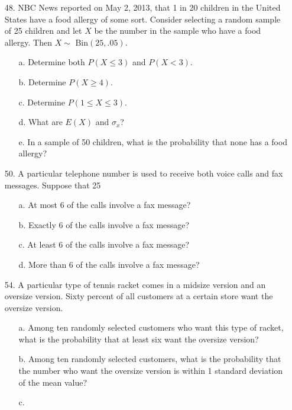 \documentclass[letterpaper,12pt]{article}
\begin{document}
\begin{enumerate}
\begin{enumerate}
    \end{enumerate}
  \item[48.]
    NBC News reported on May 2, 2013, that 1 in 20 children in the United States have a food allergy of some sort. Consider selecting a random sample of 25 children and let $X$ be the number in the sample who have a food allergy. Then $X \sim$ Bin$(25, .05)$.
    \begin{enumerate}
      \item[a.]
        Determine both $P(X \le 3)$ and $P(X < 3)$.
      \item[b.]
        Determine $P(X \ge 4)$.
      \item[c.]
        Determine $P(1 \le X \le 3)$.
      \item[d.]
        What are $E(X)$ and $\sigma_x$?
      \item[e.]
        In a sample of 50 children, what is the probability that none has a food allergy?
    \end{enumerate}
  \item[50.]
    A particular telephone number is used to receive both voice calls and fax messages. Suppose that 25%
    \begin{enumerate}
      \item[a.]
        At most 6 of the calls involve a fax message?
      \item[b.]
        Exactly 6 of the calls involve a fax message?
      \item[c.]
        At least 6 of the calls involve a fax message?
      \item[d.]
        More than 6 of the calls involve a fax message?
    \end{enumerate}
  \item[54.]
    A particular type of tennis racket comes in a midsize version and an oversize version. Sixty percent of all customers at a certain store want the oversize version.
    \begin{enumerate}
      \item[a.]
        Among ten randomly selected customers who want this type of racket, what is the probability that at least six want the oversize version?
      \item[b.]
        Among ten randomly selected customers, what is the probability that the number who want the oversize version is within 1 standard deviation of the mean value?
      \item[c.]

\end{enumerate}
\end{enumerate}
\end{document}
